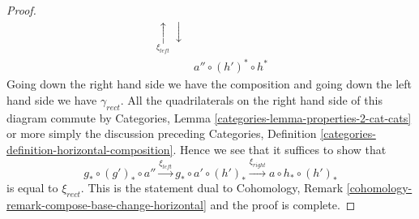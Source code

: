 \begin{proof}
$$\begin{array}{cc}
\underset{\xi_{left}}{\uparrow}\downarrow \\  & a'' \circ (h')^* \circ h^*\end{array}
$$
Going down the right hand side we have the composition and going
down the left hand side we have $\gamma_{rect}$.
All the quadrilaterals on the right hand side of this diagram commute
by Categories, Lemma \ref{categories-lemma-properties-2-cat-cats}
or more simply the discussion preceding
Categories, Definition \ref{categories-definition-horizontal-composition}.
Hence we see that it suffices to show that
$$
g_* \circ (g')_* \circ a'' \xrightarrow{\xi_{left}}
g_* \circ a' \circ (h')_* \xrightarrow{\xi_{right}}
a \circ h_* \circ (h')_*
$$
is equal to $\xi_{rect}$. This is the statement dual to
Cohomology, Remark \ref{cohomology-remark-compose-base-change-horizontal}
and the proof is complete.
\end{proof}

